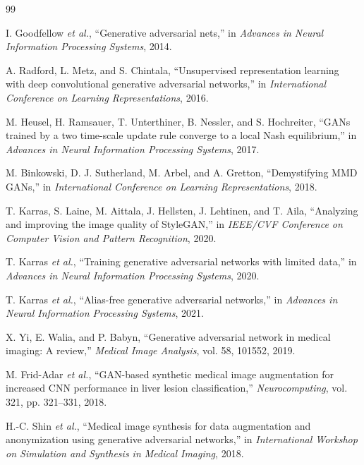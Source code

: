 \documentclass[conference,twoside]{IEEEtran}
\newcommand{\bodyfont}{\rmfamily}
\begin{document}
\begin{thebibliography}{99}
\bodyfont\small\linespread{0.94}\selectfont
\setlength{\itemsep}{0pt}
\setlength{\parsep}{0pt}
\setlength{\parskip}{0pt}

I. Goodfellow \textit{et al.}, ``Generative adversarial nets,'' in \emph{Advances in Neural Information Processing Systems}, 2014.

A. Radford, L. Metz, and S. Chintala, ``Unsupervised representation learning with deep convolutional generative adversarial networks,'' in \emph{International Conference on Learning Representations}, 2016.

M. Heusel, H. Ramsauer, T. Unterthiner, B. Nessler, and S. Hochreiter, ``GANs trained by a two time-scale update rule converge to a local Nash equilibrium,'' in \emph{Advances in Neural Information Processing Systems}, 2017.

M. Binkowski, D. J. Sutherland, M. Arbel, and A. Gretton, ``Demystifying MMD GANs,'' in \emph{International Conference on Learning Representations}, 2018.

T. Karras, S. Laine, M. Aittala, J. Hellsten, J. Lehtinen, and T. Aila, ``Analyzing and improving the image quality of StyleGAN,'' in \emph{IEEE/CVF Conference on Computer Vision and Pattern Recognition}, 2020.

T. Karras \textit{et al.}, ``Training generative adversarial networks with limited data,'' in \emph{Advances in Neural Information Processing Systems}, 2020.

T. Karras \textit{et al.}, ``Alias-free generative adversarial networks,'' in \emph{Advances in Neural Information Processing Systems}, 2021.

X. Yi, E. Walia, and P. Babyn, ``Generative adversarial network in medical imaging: A review,'' \emph{Medical Image Analysis}, vol. 58, 101552, 2019.

M. Frid-Adar \textit{et al.}, ``GAN-based synthetic medical image augmentation for increased CNN performance in liver lesion classification,'' \emph{Neurocomputing}, vol. 321, pp. 321--331, 2018.

H.-C. Shin \textit{et al.}, ``Medical image synthesis for data augmentation and anonymization using generative adversarial networks,'' in \emph{International Workshop on Simulation and Synthesis in Medical Imaging}, 2018.


\end{thebibliography}
\end{document}

